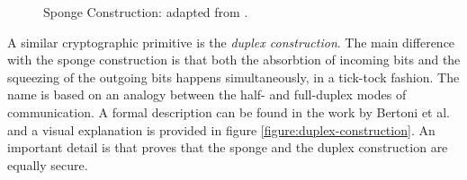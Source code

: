 \begin{figure}
  \caption{Sponge Construction: adapted from \cite{bertoni:2011:duplexing,marcos:2015:lyra2}.}
  \label{figure:sponge-construction}
\end{figure}

A similar cryptographic primitive is the \emph{duplex construction}. The main difference with the sponge construction is that both the absorbtion of incoming bits and the squeezing of the outgoing bits happens simultaneously, in a tick-tock fashion. The name is based on an analogy between the half- and full-duplex modes of communication. A formal description can be found in the work by Bertoni et al. \cite{bertoni:2011:duplexing} and a visual explanation is provided in figure \ref{figure:duplex-construction}. An important detail is that \cite{bertoni:2011:duplexing} proves that the sponge and the duplex construction are equally secure.

